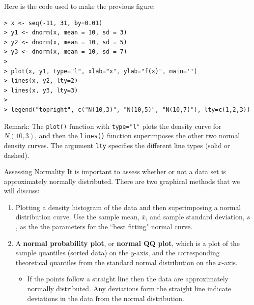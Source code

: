 \documentclass[10pt]{beamer}
\begin{document}
\begin{frame}[fragile]
Here is the code used to make the previous figure:
\footnotesize
\begin{verbatim}
> x <- seq(-11, 31, by=0.01)
> y1 <- dnorm(x, mean = 10, sd = 3)
> y2 <- dnorm(x, mean = 10, sd = 5)
> y3 <- dnorm(x, mean = 10, sd = 7)
> 
> plot(x, y1, type="l", xlab="x", ylab="f(x)", main='')
> lines(x, y2, lty=2)
> lines(x, y3, lty=3)
> 
> legend("topright", c("N(10,3)", "N(10,5)", "N(10,7)"), lty=c(1,2,3))
\end{verbatim}

\small
Remark: The \texttt{plot()} function with \texttt{type="l"} plots the density curve for $N(10,3)$, and then the \texttt{lines()} function superimposes the other two normal density curves.  The argument \texttt{lty} specifies the different line types (solid or dashed). 
\end{frame}



\begin{frame}{Assessing Normality}
It is important to assess whether or not a data set is approximately normally distributed.  There are two graphical methods that we will discuss:

\begin{enumerate}
\item Plotting a density histogram of the data and then superimposing a normal distribution curve.  Use the sample mean, $\bar{x}$, and sample standard deviation, $s$, as the the parameters for the ``best fitting" normal curve. 
\item A \textbf{normal probability plot}, or \textbf{normal QQ plot}, which is a plot of the sample quantiles (sorted data) on the $y$-axis, and the corresponding theoretical quantiles from the standard normal distribution on the $x$-axis.
\begin{itemize}
\item If the points follow a straight line then the data are approximately normally distributed.  Any deviations form the straight line indicate deviations in the data from the normal distribution.
\end{itemize}
\end{enumerate}
\end{frame}
\end{document}
